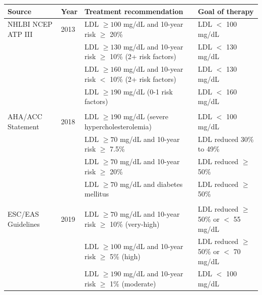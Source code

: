\documentclass[12pt]{article}
\begin{document}
\begin{appendix}
    \begin{table}[H]
        \centering
        \tiny{
        \begin{threeparttable}
        \begin{tabular}{llll}
            \toprule
            Source & Year & Treatment recommendation & Goal of therapy\\
            \midrule  
            NHLBI NCEP ATP III \cite{noauthor_third_2002} & 2013 & LDL $\geq 100$ mg/dL and 10-year risk\tnote{*} \hspace{1pt}  $\geq$ 20\%  & LDL $<$ 100 mg/dL \\
            & & LDL $\geq 130$ mg/dL and 10-year risk\tnote{*} \hspace{1pt}  $\geq$ 10\% (2+ risk factors) & LDL $<$ 130 mg/dL  \\
            & & LDL $\geq 160$ mg/dL and 10-year risk\tnote{*} \hspace{1pt}  $<$ 10\% (2+ risk factors) & LDL $<$ 130 mg/dL  \\
            & & LDL $\geq 190$ mg/dL (0-1 risk factors) & LDL $<$ 160 mg/dL \\
            & & & \\
            AHA/ACC Statement \cite{grundy_scott_m_2018_2019} & 2018 & LDL $\geq 190$ mg/dL (severe hypercholesterolemia) & LDL $<$ 100 mg/dL \\
            & & LDL $\geq 70$ mg/dL and 10-year risk\tnote{*} \hspace{1pt}  $\geq$ 7.5\%  & LDL reduced 30\% to 49\%\\
            & & LDL $\geq 70$ mg/dL and 10-year risk\tnote{*} \hspace{1pt}  $\geq$ 20\% & LDL reduced $\geq$ 50\%\\
            & & LDL $\geq 70$ mg/dL and diabetes mellitus & LDL reduced $\geq$ 50\% \\
            & & & \\
            ESC/EAS Guidelines \cite{mach_2019_2020} & 2019 & LDL $\geq 70$ mg/dL and 10-year risk\tnote{\textdagger} \hspace{1pt} $\geq$ 10\% (very-high) & LDL reduced $\geq$ 50\% or $<$ 55 mg/dL \\
            & & LDL $\geq 100$ mg/dL and 10-year risk\tnote{\textdagger} \hspace{1pt}  $\geq$ 5\% (high) & LDL reduced $\geq$ 50\% or $<$ 70 mg/dL \\
            & & LDL $\geq 190$ mg/dL and 10-year risk\tnote{\textdagger} \hspace{1pt}  $\geq$ 1\% (moderate) & LDL $<$ 100 mg/dL \\

\end{tabular}
\end{threeparttable}}
\end{table}
\end{appendix}
\end{document}
